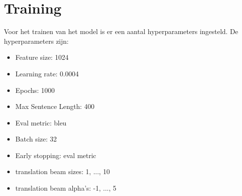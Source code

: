 \section{Training}
\label{sec:training}
Voor het trainen van het model is er een aantal hyperparameters ingesteld.
De hyperparameters zijn:
\begin{itemize}
  \item Feature size: 1024
  \item Learning rate: 0.0004
  \item Epochs: 1000
  \item Max Sentence Length: 400
  \item Eval metric: bleu
  \item Batch size: 32
  \item Early stopping: eval metric
  \item translation beam sizes: 1, ..., 10
  \item translation beam alpha's: -1, ..., 5
\end{itemize}

